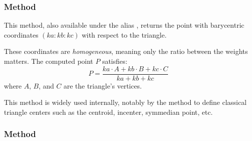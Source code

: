 \begin{tkzexample}[latex=.5\textwidth]
\end{tkzexample}


\subsubsection{Method } %
\label{ssub:_triangle_barycentric_ka_kb_kc}

This method, also available under the alias , returns the point with barycentric coordinates $(ka : kb : kc)$ with respect to the triangle.

\medskip
\noindent
These coordinates are \emph{homogeneous}, meaning only the ratio between the weights matters. The computed point $P$ satisfies:
\[
P = \frac{ka \cdot A + kb \cdot B + kc \cdot C}{ka + kb + kc}
\]
where $A$, $B$, and $C$ are the triangle's vertices.

\medskip
\noindent
This method is widely used internally, notably by the  method to define classical triangle centers such as the centroid, incenter, symmedian point, etc.


\vspace{1em}

\begin{tkzexample}[latex=.5\textwidth]
\end{tkzexample}


\subsubsection{Method } %
\label{ssub:method_triangle_trilinear_x_y_z}

